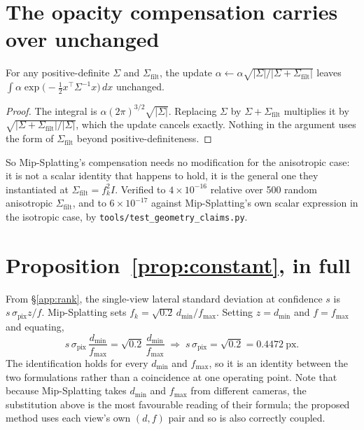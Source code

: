 \section{The opacity compensation carries over unchanged}
\label{app:mass}
\begin{lemma}
\label{lem:mass}
For any positive-definite $\Sigma$ and $\Sigma_{\mathrm{filt}}$, the update
$\alpha \leftarrow \alpha\sqrt{|\Sigma| / |\Sigma + \Sigma_{\mathrm{filt}}|}$
leaves $\int \alpha \exp\!\big(-\tfrac12 x^{\!\top}\Sigma^{-1}x\big)\,dx$
unchanged.
\end{lemma}
\begin{proof}
The integral is $\alpha(2\pi)^{3/2}\sqrt{|\Sigma|}$. Replacing $\Sigma$ by
$\Sigma + \Sigma_{\mathrm{filt}}$ multiplies it by
$\sqrt{|\Sigma + \Sigma_{\mathrm{filt}}|/|\Sigma|}$, which the update cancels
exactly. Nothing in the argument uses the form of $\Sigma_{\mathrm{filt}}$
beyond positive-definiteness.
\end{proof}
So Mip-Splatting's compensation needs no modification for the anisotropic case:
it is not a scalar identity that happens to hold, it is the general one they
instantiated at $\Sigma_{\mathrm{filt}} = f_k^2 I$. Verified to
$4\times10^{-16}$ relative over 500 random anisotropic $\Sigma_{\mathrm{filt}}$,
and to $6\times10^{-17}$ against Mip-Splatting's own scalar expression in the
isotropic case, by \texttt{tools/test\_geometry\_claims.py}.


\section{Proposition~\ref{prop:constant}, in full}
\label{app:prop1}
From \S\ref{app:rank}, the single-view lateral standard deviation at confidence
$s$ is $s\,\sigma_{\mathrm{pix}}z/f$. Mip-Splatting sets
$f_k = \sqrt{0.2}\,d_{\min}/f_{\max}$. Setting $z = d_{\min}$ and $f = f_{\max}$
and equating,
\begin{equation}
  s\,\sigma_{\mathrm{pix}}\,\frac{d_{\min}}{f_{\max}}
  = \sqrt{0.2}\,\frac{d_{\min}}{f_{\max}}
  \;\Longrightarrow\;
  s\,\sigma_{\mathrm{pix}} = \sqrt{0.2} = 0.4472\ \text{px}.
\end{equation}
The identification holds for every $d_{\min}$ and $f_{\max}$, so it is an
identity between the two formulations rather than a coincidence at one operating
point. Note that because Mip-Splatting takes $d_{\min}$ and $f_{\max}$ from
different cameras, the substitution above is the most favourable reading of their
formula; the proposed method uses each view's own $(d,f)$ pair and so is also
correctly coupled.

